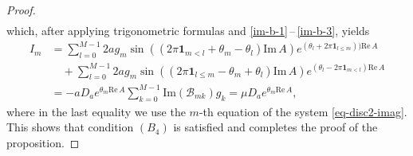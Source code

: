 \documentclass[11pt, letterpaper, reqno]{amsart}
\numberwithin{equation}{section}
\theoremstyle{definition}
\theoremstyle{plain}
\numberwithin{equation}{section}
\begin{document}
\begin{proof}
\begin{align*}
\end{align*}
which, after applying trigonometric formulas and \eqref{im-b-1}\,--\,\eqref{im-b-3}, yields
\begin{align*}
I_{m}& = \sum_{l=0}^{M-1}2ag_{m}\sin((2\pi\mathbf{1}_{m < l}+\theta_{m}-\theta_{l})\mathrm{Im}\,A)e^{(\theta_{l} + 2\pi\mathbf{1}_{l\le m}))\mathrm{Re}\,A} \\
& \quad + \sum_{l=0}^{M-1}2ag_{m}\sin((2\pi\mathbf{1}_{l\le m} - \theta_{m} + \theta_{l})\mathrm{Im}\,A)e^{(\theta_{l} - 2\pi\mathbf{1}_{m<l})\mathrm{Re}\,A} \\
& = -aD_{a}e^{\theta_{m}\mathrm{Re}\,A} \sum_{k=0}^{M-1} \mathrm{Im}(\mathcal{B}_{mk})g_{k} = \mu D_{a}e^{\theta_{m}\mathrm{Re}\,A},
\end{align*}
where in the last equality we use the $m$-th equation of the system \eqref{eq-disc2-imag}. This shows that condition $(B_{4})$ is satisfied  and completes the proof of the proposition.
\end{proof}
\end{document}
